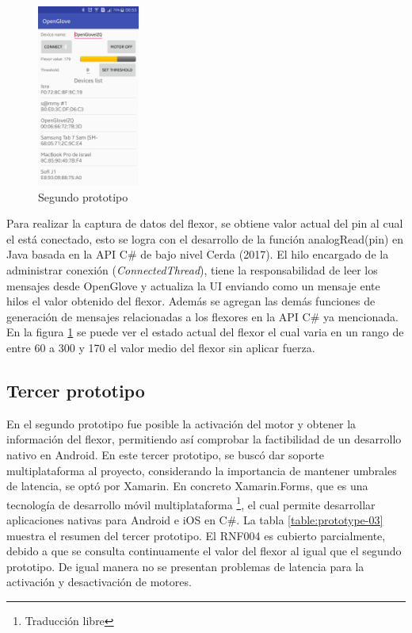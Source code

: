 \begin{figure}[H]
  \begin{center} 
   	\includegraphics[width=0.3\textwidth]{images/chapter03/02-prototype.png} 
    \caption{Segundo prototipo} 
    \label{fig:prototype-02}
  \end{center}
\end{figure}

Para realizar la captura de datos del flexor, se obtiene valor actual del pin al cual el está conectado, esto se logra con el desarrollo de la función analogRead(pin) en Java basada en la API C\# de bajo nivel Cerda (2017). El hilo encargado de la administrar conexión (\textit{ConnectedThread}), tiene la responsabilidad de leer los mensajes desde OpenGlove y actualiza la UI enviando como un mensaje ente hilos el valor obtenido del flexor. Además se agregan las demás funciones de generación de mensajes relacionadas a los flexores en la API C\# ya mencionada. En la figura \ref{fig:prototype-02} se puede ver el estado actual del flexor el cual varia en un rango de entre 60 a 300 y 170 el valor medio del flexor sin aplicar fuerza.

\subsection{Tercer prototipo}
\label{tercer-prototipo}
En el segundo prototipo fue posible la activación del motor y obtener la información del flexor, permitiendo así comprobar la factibilidad de un desarrollo nativo en Android. En este tercer prototipo, se buscó dar soporte multiplataforma al proyecto, considerando la importancia de mantener umbrales de latencia, se optó por Xamarin. En concreto Xamarin.Forms,  que es una tecnología de desarrollo móvil multiplataforma \footnote{Traducción libre}, el cual permite desarrollar aplicaciones nativas para Android e iOS en C\#. La tabla \ref{table:prototype-03} muestra el resumen del tercer prototipo. El RNF004 es cubierto parcialmente, debido a que se consulta continuamente el valor del flexor al igual que el segundo prototipo. De igual manera no se presentan problemas de latencia para la activación y desactivación de motores.

